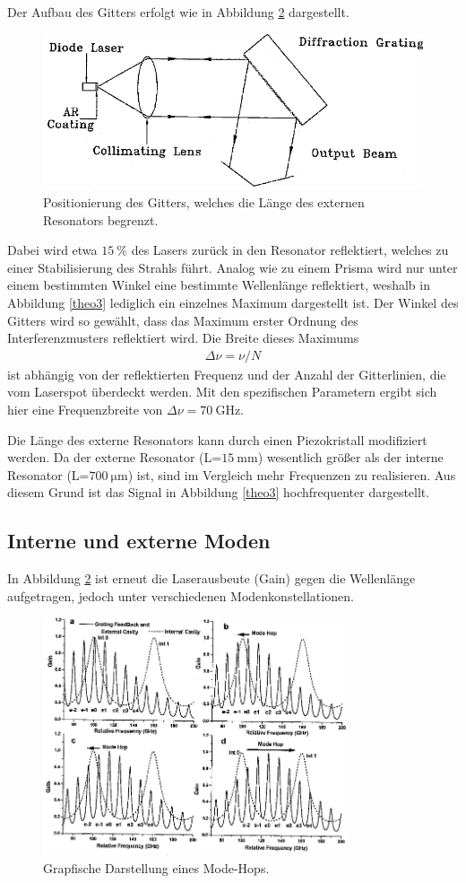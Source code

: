 Der Aufbau des Gitters erfolgt wie in Abbildung \ref{theo5} dargestellt.
\begin{figure}[H]
\centering
\includegraphics[width=0.\textwidth]{ressources/Grating.png}
\caption{Positionierung des Gitters, welches die Länge des externen Resonators begrenzt. \cite{skript}}
\label{theo5}
\end{figure}

Dabei wird etwa $\SI{15}{\percent}$ des Lasers zurück in den Resonator reflektiert, welches zu einer Stabilisierung des Strahls führt. Analog wie zu einem Prisma wird nur unter einem bestimmten Winkel eine bestimmte Wellenlänge reflektiert, weshalb in Abbildung \ref{theo3} lediglich ein einzelnes Maximum dargestellt ist. Der Winkel des Gitters wird so gewählt, dass das Maximum erster Ordnung des Interferenzmusters reflektiert wird. Die Breite dieses Maximums
\begin{align}
	\Delta \nu= \nu/N
\end{align}
ist abhängig von der reflektierten Frequenz und der Anzahl der Gitterlinien, die vom Laserspot überdeckt werden. Mit den spezifischen Parametern ergibt sich hier eine Frequenzbreite von $\Delta \nu = \SI{70}{\giga\hertz}$.

Die Länge des externe Resonators kann durch einen Piezokristall modifiziert werden. Da der externe Resonator (L=$\SI{15}{\milli\meter}$) wesentlich größer als der interne Resonator (L=$\SI{700}{\micro\meter}$) ist, sind im Vergleich mehr Frequenzen zu realisieren. Aus diesem Grund ist das Signal in Abbildung \ref{theo3} hochfrequenter dargestellt. 

\subsection{Interne und externe Moden} 
In Abbildung \ref{theo5} ist erneut die Laserausbeute (Gain) gegen die Wellenlänge aufgetragen, jedoch unter verschiedenen Modenkonstellationen. 

\begin{figure}[H]
\centering
\includegraphics[width=0.8\textwidth]{ressources/Mode_Hop.png}
\caption{Grapfische Darstellung eines Mode-Hops. \cite{skript}}
\label{theo5}
\end{figure}

